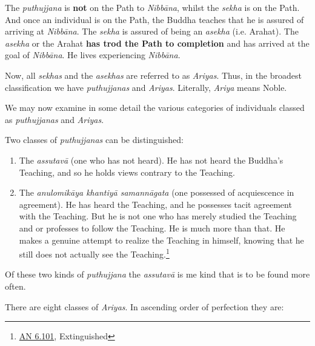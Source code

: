 The \emph{puthujjana} is \textbf{not} on the Path to \emph{Nibbāna}, whilst the \emph{sekha}
is on the Path. And once an individual is on the Path, the Buddha
teaches that he is assured of arriving at \emph{Nibbāna}. The \emph{sekha} is
assured of being an \emph{asekha} (i.e. Arahat). The \emph{asekha} or the Arahat
\textbf{has trod the Path to completion} and has arrived at the goal of
\emph{Nibbāna}. He lives experiencing \emph{Nibbāna}.


Now, all \emph{sekhas} and the \emph{asekhas} are referred to as \emph{Ariyas}. Thus,
in the broadest classification we have \emph{puthujjanas} and \emph{Ariyas}.
Literally, \emph{Ariya} means Noble.


We may now examine in some detail the various categories of individuals
classed as \emph{puthujjanas} and \emph{Ariyas}.


Two classes of \emph{puthujjanas} can be distinguished:


\begin{enumerate}

\item{The \emph{assutavā} (one who has not heard). He has not heard the
Buddha’s Teaching, and so he holds views contrary to the Teaching.}

\item{The \emph{anulomikāya khantiyā samannāgata} (one possessed of
acquiescence in agreement). He has heard the Teaching, and he possesses
tacit agreement with the Teaching. But he is not one who has merely
studied the Teaching and or professes to follow the Teaching. He is much
more than that. He makes a genuine attempt to realize the Teaching in
himself, knowing that he still does not actually see the
Teaching.\footnote{\href{https://suttacentral.net/an6.101/en/sujato}{AN 6.101}, Extinguished}}

\end{enumerate}


Of these two kinds of \emph{puthujjana} the \emph{assutavā} is me kind that is to
be found more often.


There are eight classes of \emph{Ariyas}. In ascending order of perfection
they are:


